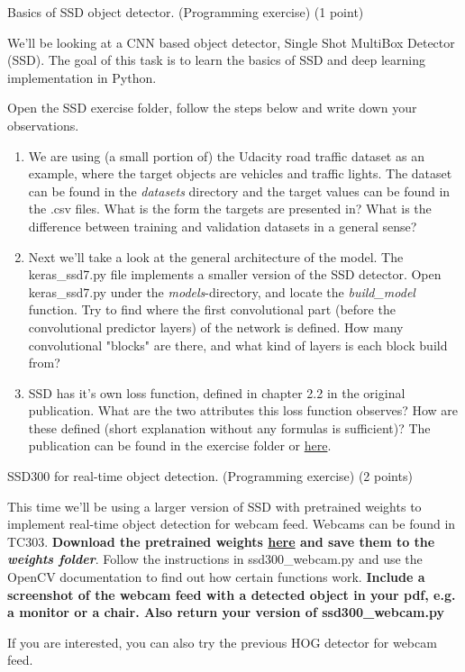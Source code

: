 \documentclass[12pt]{article} %
\newenvironment{exercise}[2][Task]{\begin{trivlist}
\item[\hskip \labelsep {\bfseries #1}\hskip \labelsep {\bfseries #2.}]}{\end{trivlist}}
\begin{document}
\begin{exercise}{2} 
Basics of SSD object detector. (Programming exercise) (1 point)

\noindent We'll be looking at a CNN based object detector, Single Shot MultiBox Detector (SSD). The goal of this task is to learn the basics of SSD and deep learning implementation in Python.

\noindent Open the SSD exercise folder, follow the steps below and write down your observations.
\begin{enumerate}
	\item We are using (a small portion of) the Udacity road traffic dataset as an example, where the target objects are vehicles and traffic lights. The dataset can be found in the \textit{datasets} directory and the target values can be found in the .csv files. What is the form the targets are presented in? What is the difference between training and validation datasets in a general sense? 
	
	\item Next we'll take a look at the general architecture of the model. The keras\_ssd7.py file implements a smaller version of the SSD detector. Open keras\_ssd7.py under the \textit{models}-directory, and locate the \textit{build\_model} function. Try to find where the first convolutional part (before the convolutional predictor layers) of the network is defined. How many convolutional "blocks" are there, and what kind of layers is each block build from?
	
	\item SSD has it's own loss function, defined in chapter 2.2 in the original publication. What are the two attributes this loss function observes? How are these defined (short explanation without any formulas is sufficient)? The publication can be found in the exercise folder or \href{https://arxiv.org/pdf/1512.02325.pdf}{here}.
	
	
\end{enumerate}


\end{exercise}

\begin{exercise}{3}
SSD300 for real-time object detection. (Programming exercise) (2 points)

\noindent This time we'll be using a larger version of SSD with pretrained weights to implement real-time object detection for webcam feed. Webcams can be found in TC303. \textbf{Download the pretrained weights \href{https://drive.google.com/file/d/121-kCXaOHOkJE_Kf5lKcJvC_5q1fYb_q/view}{here} and save them to the \textit{weights folder}}. Follow the instructions in ssd300\_webcam.py and use the OpenCV documentation to find out how certain functions work. \textbf{Include a screenshot of the webcam feed with a detected object in your pdf, e.g. a monitor or a chair. Also return your version of ssd300\_webcam.py}

\noindent If you are interested, you can also try the previous HOG detector for webcam feed.

\end{exercise}
\end{document}
